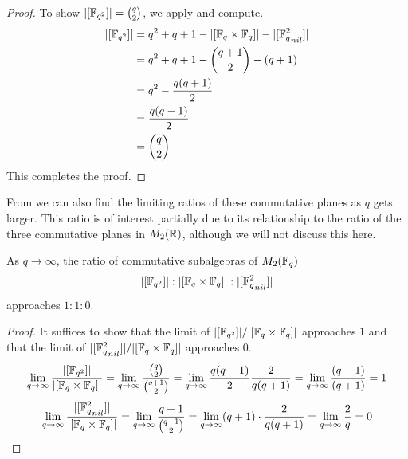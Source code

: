 \documentclass{amsart}
\begin{document}
\begin{proof}
    To show $|[\protect\mathbb{F}_{q^2}]| = \binom{q}{2}$, we apply  and compute.
    \begin{align*}
        |[\protect\mathbb{F}_{q^2}]| &= q^2 + q + 1 - |[\protect\mathbb{F}_q \times \protect\mathbb{F}_q]| - |[{\protect\mathbb{F}_q^2}_{nil}]| \\
                      &= q^2 + q + 1 - \binom{q+1}{2} - (q+1) \\
                      &= q^2 - \frac{q(q+1)}{2} \\
                      &= \frac{q(q-1)}{2} \\
                      &= \binom{q}{2}
    \end{align*}
    This completes the proof.
\end{proof}
From  we can also find the limiting ratios of these commutative planes as $q$ gets larger. This ratio is of interest partially due to its relationship to the ratio of the three commutative planes in $M_2(\protect\mathbb{R})$, although we will not discuss this here.
\begin{cor}
    As $q \rightarrow \infty$, the ratio of commutative subalgebras of $M_2(\protect\mathbb{F}_q)$
    \begin{align*}
        |[\protect\mathbb{F}_{q^2}]| : |[\protect\mathbb{F}_q \times \protect\mathbb{F}_q]| : |[{\protect\mathbb{F}_q^2}_{nil}]|
    \end{align*}
    approaches $1 : 1 : 0$.
\end{cor}

\begin{proof}
    It suffices to show that the limit of $|[\protect\mathbb{F}_{q^2}]| / |[\protect\mathbb{F}_q \times \protect\mathbb{F}_q]|$ approaches $1$ and that the limit of  $|[{\protect\mathbb{F}_q^2}_{nil}]| / |[\protect\mathbb{F}_q \times \protect\mathbb{F}_q]|$ approaches $0$.
    \begin{align*}
        \lim\limits_{q \rightarrow \infty} \frac{|[\protect\mathbb{F}_{q^2}]|}{|[\protect\mathbb{F}_q \times \protect\mathbb{F}_q]|}
            = \lim\limits_{q \rightarrow \infty} \frac{\binom{q}{2}}{\binom{q+1}{2}}
            = \lim\limits_{q \rightarrow \infty} \frac{q(q-1)}{2}\frac{2}{q(q+1)}
            = \lim\limits_{q \rightarrow \infty} \frac{(q-1)}{(q+1)}
            = 1
    \end{align*}
    \begin{align*}
        \lim\limits_{q \rightarrow \infty} \frac{|[{\protect\mathbb{F}_q^2}_{nil}]|}{|[\protect\mathbb{F}_q \times \protect\mathbb{F}_q]|}
            = \lim\limits_{q \rightarrow \infty} \frac{q+1}{\binom{q+1}{2}}
            = \lim\limits_{q \rightarrow \infty} (q+1)\cdot\frac{2}{q(q+1)}
            = \lim\limits_{q \rightarrow \infty} \frac{2}{q}
            = 0
    \end{align*}
\end{proof}
\end{document}
